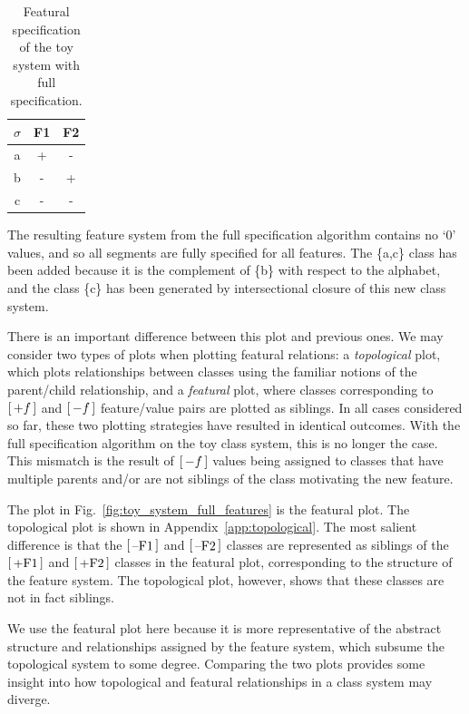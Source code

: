 \documentclass[12pt, oneside]{article}   	%
\newcommand{\featmat}[1]
{$\begin{bsmallmatrix*}[l]\text{\normalsize #1}\end{bsmallmatrix*}$}
\begin{document}
\begin{table}[h]
	\centering
	\begin{tabular} {|c||c|c|}
		\hline
		$\sigma$ & F1 & F2 \\ \hline
		a & + & - \\
		b & - & + \\
		c & - & - \\
		\hline
	\end{tabular}
	\caption{Featural specification of the toy system with full specification.}
	\label{table:toy_system_full}
\end{table}

The resulting feature system from the full specification algorithm contains no `0' values, and so all segments are fully specified for all features. The \{a,c\} class has been added because it is the complement of \{b\} with respect to the alphabet, and the class \{c\} has been generated by intersectional closure of this new class system.

There is an important difference between this plot and previous ones. We may consider two types of plots when plotting featural relations: a \emph{topological} plot, which plots relationships between classes using the familiar notions of the parent/child relationship, and a \emph{featural} plot, where classes corresponding to \featmat{$+f$} and \featmat{$-f$} feature/value pairs are plotted as siblings. In all cases considered so far, these two plotting strategies have resulted in identical outcomes. With the full specification algorithm on the toy class system, this is no longer the case. This mismatch is the result of \featmat{$-f$} values being assigned to classes that have multiple parents and/or are not siblings of the class motivating the new feature.

The plot in Fig.~\ref{fig:toy_system_full_features} is the featural plot. The topological plot is shown in Appendix~\ref{app:topological}. The most salient difference is that the \featmat{--F1} and \featmat{--F2} classes are represented as siblings of the \featmat{+F1} and \featmat{+F2} classes in the featural plot, corresponding to the structure of the feature system. The topological plot, however, shows that these classes are not in fact siblings.

We use the featural plot here because it is more representative of the abstract structure and relationships assigned by the feature system, which subsume the topological system to some degree. Comparing the two plots provides some insight into how topological and featural relationships in a class system may diverge. 
\end{document}
